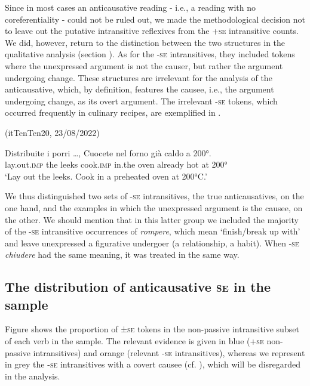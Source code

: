 \documentclass[output=paper,colorlinks,citecolor=brown
]{langscibook}
\begin{document}
Since in most cases an anticausative reading - i.e., a reading with no coreferentiality - could not be ruled out, we made the methodological decision not to leave out the putative intransitive reflexives from the +\textsc{se} intransitive counts. We did, however, return to the distinction between the two structures in the qualitative analysis (section ).
As for the -\textsc{se} intransitives, they included tokens where the unexpressed argument is not the causer, but rather the argument undergoing change. These structures are irrelevant for the analysis of the anticausative, which, by definition, features the causee, i.e., the argument undergoing change, as its overt argument. The irrelevant -\textsc{se} tokens, which occurred frequently in culinary recipes, are exemplified in .


\hspace*{\fill}(itTenTen20, 23/08/2022)\quad

\ea \label{bentley_example_6}
\gll Distribuite i porri  \ldots , Cuocete nel forno già caldo a 200°. \\
    lay.out.\textsc{imp}	the	leeks {} cook.\textsc{imp} in.the oven already hot at 200° \\
\glt ‘Lay out the leeks. Cook in a preheated oven at 200°C.’ 
\z

We thus distinguished two sets of -\textsc{se} intransitives, the true anticausatives, on the one hand, and the examples in which the unexpressed argument is the causee, on the other. We should mention that in this latter group we included the majority of the -\textsc{se} intransitive occurrences of \textit{rompere}, which mean ‘finish/break up with’ and leave unexpressed a figurative undergoer (a relationship, a habit). When -\textsc{se} \textit{chiudere} had the same meaning, it was treated in the same way. 

\subsection{The distribution of anticausative \textsc{se} in the sample}
\label{bentley_section_3.2}
Figure  shows the proportion of ±\textsc{se} tokens in the non-passive intransitive subset of each verb in the sample. The relevant evidence is given in blue (+\textsc{se} non-passive intransitives) and orange (relevant -\textsc{se} intransitives), whereas we represent in grey the -\textsc{se} intransitives with a covert causee (cf. ), which will be disregarded in the analysis.
\end{document}
